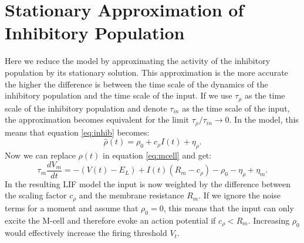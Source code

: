\documentclass[a4paper,10pt,hidelinks]{scrreprt}
\begin{document}
	\section{Stationary Approximation of Inhibitory Population}
	Here we reduce the model by approximating the activity of the inhibitory population by its 
	stationary solution.
	This approximation is the more accurate the higher the difference is between the time scale of 
	the dynamics of the inhibitory population and the time scale of the input.
	If we use $\tau_{\rho}$ as the time scale of the inhibitory population and denote $\tau_{in}$ 
	as the time scale of the input, the approximation becomes equivalent for the limit 
	$\tau_{\rho}/ \tau_{in} \rightarrow 0$.
	In the model, this means that equation \ref{eq:inhib} becomes:
	\begin{equation}
	\hat{\rho} (t) = \rho_{0} + c_{\rho} I(t) + \eta_{\rho}.
	\label{eq:inhib_approx}
	\end{equation}
	Now we can replace $\rho (t)$ in equation \ref{eq:mcell} and get:
	\begin{equation}
	\tau _m \frac{dV_m}{dt} = - (V(t) - E_{L}) + I(t)(R_{m} - c_{\rho}) - \rho_{0} - 
	\eta_{\rho} +  \eta _m.
	\label{eq:mcell_approx1}
	\end{equation}
	In the resulting LIF model the input is now weighted by the difference between the scaling 
	factor $c_{\rho}$ and the membrane resistance $R_m$.
	If we ignore the noise terms for a moment and assume that $\rho_{0}=0$, this means that the 
	input can only excite the M-cell and therefore evoke an action potential if $c_{\rho} < R_m$.
	Increasing $\rho_{0}$ would effectively increase the firing threshold $V_t$.
\end{document}
